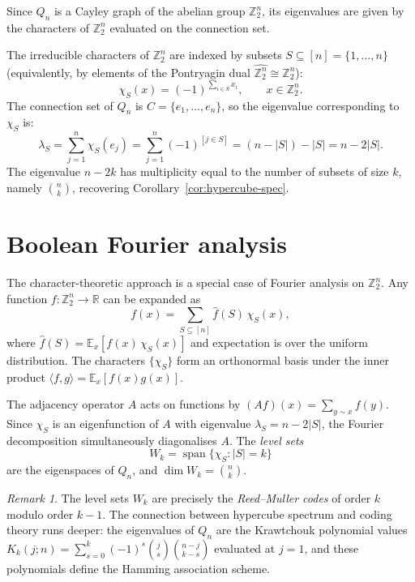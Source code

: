 \documentclass[11pt,a4paper]{article}
\theoremstyle{plain}
\theoremstyle{definition}
\theoremstyle{remark}
\newtheorem{remark}[theorem]{Remark}
\newcommand{\Z}{\mathbb{Z}}
\newcommand{\R}{\mathbb{R}}
\begin{document}
Since $Q_n$ is a Cayley graph of the abelian group $\Z_2^n$, its eigenvalues
are given by the characters of $\Z_2^n$ evaluated on the connection set.

The irreducible characters of $\Z_2^n$ are indexed by subsets
$S \subseteq [n] = \{1, \ldots, n\}$ (equivalently, by elements of the
Pontryagin dual $\widehat{\Z_2^n} \cong \Z_2^n$):
\[
  \chi_S(x) = (-1)^{\sum_{i \in S} x_i}, \qquad x \in \Z_2^n.
\]
The connection set of $Q_n$ is $C = \{e_1, \ldots, e_n\}$, so the eigenvalue
corresponding to $\chi_S$ is:
\[
  \lambda_S = \sum_{j=1}^n \chi_S(e_j)
  = \sum_{j=1}^n (-1)^{[j \in S]}
  = (n - |S|) - |S|
  = n - 2|S|.
\]
The eigenvalue $n - 2k$ has multiplicity equal to the number of subsets of
size $k$, namely $\binom{n}{k}$, recovering Corollary~\ref{cor:hypercube-spec}.


\section{Boolean Fourier analysis}

The character-theoretic approach is a special case of Fourier analysis on
$\Z_2^n$. Any function $f : \Z_2^n \to \R$ can be expanded as
\[
  f(x) = \sum_{S \subseteq [n]} \hat{f}(S)\, \chi_S(x),
\]
where $\hat{f}(S) = \mathbb{E}_{x}[f(x)\,\chi_S(x)]$ and expectation is
over the uniform distribution. The characters $\{\chi_S\}$ form an
orthonormal basis under the inner product
$\langle f, g \rangle = \mathbb{E}_x[f(x)g(x)]$.

The adjacency operator $A$ acts on functions by
$(Af)(x) = \sum_{y \sim x} f(y)$. Since $\chi_S$ is an eigenfunction of $A$
with eigenvalue $\lambda_S = n - 2|S|$, the Fourier decomposition
simultaneously diagonalises $A$. The \emph{level sets}
\[
  W_k = \operatorname{span}\{\chi_S : |S| = k\}
\]
are the eigenspaces of $Q_n$, and $\dim W_k = \binom{n}{k}$.

\begin{remark}
The level sets $W_k$ are precisely the \emph{Reed--Muller codes} of order
$k$ modulo order $k{-}1$. The connection between hypercube spectrum and coding
theory runs deeper: the eigenvalues of $Q_n$ are the Krawtchouk polynomial
values $K_k(j; n) = \sum_{s=0}^k (-1)^s \binom{j}{s}\binom{n-j}{k-s}$
evaluated at $j = 1$, and these polynomials define the Hamming association
scheme.
\end{remark}
\end{document}
